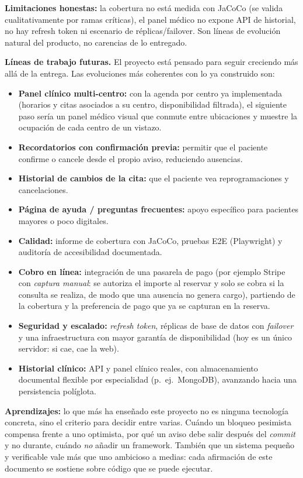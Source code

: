 \documentclass[12pt,a4paper]{report}
\begin{document}
\textbf{Limitaciones honestas:} la cobertura no está medida con JaCoCo (se valida cualitativamente por ramas críticas), el panel médico no expone API de historial, no hay refresh token ni escenario de réplicas/failover. Son líneas de evolución natural del producto, no carencias de lo entregado.

\textbf{Líneas de trabajo futuras.} El proyecto está pensado para seguir creciendo más allá de la entrega. Las evoluciones más coherentes con lo ya construido son:

\begin{itemize}
  \item \textbf{Panel clínico multi-centro:} con la agenda por centro ya implementada (horarios y citas asociados a su centro, disponibilidad filtrada), el siguiente paso sería un panel médico visual que conmute entre ubicaciones y muestre la ocupación de cada centro de un vistazo.
  \item \textbf{Recordatorios con confirmación previa:} permitir que el paciente confirme o cancele desde el propio aviso, reduciendo ausencias.
  \item \textbf{Historial de cambios de la cita:} que el paciente vea reprogramaciones y cancelaciones.
  \item \textbf{Página de ayuda / preguntas frecuentes:} apoyo específico para pacientes mayores o poco digitales.
  \item \textbf{Calidad:} informe de cobertura con JaCoCo, pruebas E2E (Playwright) y auditoría de accesibilidad documentada.
  \item \textbf{Cobro en línea:} integración de una pasarela de pago (por ejemplo Stripe con \emph{captura manual}: se autoriza el importe al reservar y solo se cobra si la consulta se realiza, de modo que una ausencia no genera cargo), partiendo de la cobertura y la preferencia de pago que ya se capturan en la reserva.
  \item \textbf{Seguridad y escalado:} \emph{refresh token}, réplicas de base de datos con \emph{failover} y una infraestructura con mayor garantía de disponibilidad (hoy es un único servidor: si cae, cae la web).
  \item \textbf{Historial clínico:} API y panel clínico reales, con almacenamiento documental flexible por especialidad (p.\ ej.\ MongoDB), avanzando hacia una persistencia políglota.
\end{itemize}

\textbf{Aprendizajes:} lo que más ha enseñado este proyecto no es ninguna tecnología concreta, sino el criterio para decidir entre varias. Cuándo un bloqueo pesimista compensa frente a uno optimista, por qué un aviso debe salir después del \emph{commit} y no durante, cuándo \emph{no} añadir un framework. También que un sistema pequeño y verificable vale más que uno ambicioso a medias: cada afirmación de este documento se sostiene sobre código que se puede ejecutar.
\end{document}
